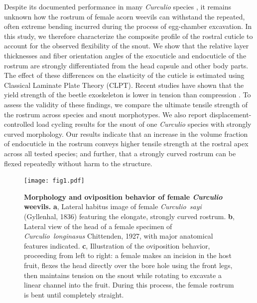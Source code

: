 \documentclass[twocolumn, linenumbers, superscriptaddress, nofootinbib]{revtex4-1}
\begin{document}
	Despite its documented performance in many \textit{Curculio} species \cite{Gibson1969, Moffett1989, AguirreUribe1978, Toju2005}, it remains unknown how the rostrum of female acorn weevils can withstand the repeated, often extreme bending incurred during the process of egg-chamber excavation.
	In this study, we therefore characterize the composite profile of the rostral cuticle to account for the observed flexibility of the snout.
	We show that the relative layer thicknesses and fiber orientation angles of the exocuticle and endocuticle of the rostrum are strongly differentiated from the head capsule and other body parts.
	The effect of these differences on the elasticity of the cuticle is estimated using Classical Laminate Plate Theory (CLPT).
	Recent studies have shown that the yield strength of the beetle exoskeleton is lower in tension than compression \cite{Longhai2017}.
	To assess the validity of these findings, we compare the ultimate tensile strength of the rostrum across species and snout morphotypes.
	We also report displacement-controlled load cycling results for the snout of one \textit{Curculio} species with strongly curved morphology.
	Our results indicate that an increase in the volume fraction of endocuticle in the rostrum conveys higher tensile strength at the rostral apex across all tested species; and further, that a strongly curved rostrum can be flexed repeatedly without harm to the structure.
	
	\begin{figure}
		\centering
		\texttt{[image: fig1.pdf]}
		\caption{\textbf{Morphology and oviposition behavior of female \textit{Curculio} weevils.} 
			\textbf{a}, Lateral habitus image of female \textit{Curculio~sayi} (Gyllenhal, 1836) featuring the elongate, strongly curved rostrum.
			\textbf{b}, Lateral view of the head of a female specimen of \textit{Curculio~longinasus} Chittenden, 1927, with major anatomical features indicated.
			\textbf{c}, Illustration of the oviposition behavior, proceeding from left to right: a female makes an incision in the host fruit, flexes the head directly over the bore hole using the front legs, then maintains tension on the snout while rotating to excavate a linear channel into the fruit. During this process, the female rostrum is bent until completely straight.
		}
		\label{fig::curculio}
	\end{figure}
	
\end{document}
